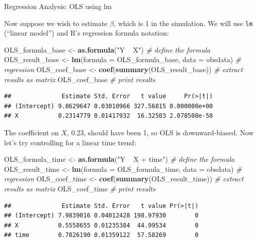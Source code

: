 \documentclass[10pt,ignorenonframetext,]{beamer}
\newenvironment{Shaded}{\begin{snugshade}}{\end{snugshade}}
\newcommand{\KeywordTok}[1]{\textcolor[rgb]{0.13,0.29,0.53}{\textbf{{#1}}}}
\newcommand{\DataTypeTok}[1]{\textcolor[rgb]{0.13,0.29,0.53}{{#1}}}
\newcommand{\StringTok}[1]{\textcolor[rgb]{0.31,0.60,0.02}{{#1}}}
\newcommand{\CommentTok}[1]{\textcolor[rgb]{0.56,0.35,0.01}{\textit{{#1}}}}
\newcommand{\NormalTok}[1]{{#1}}
\begin{document}
\begin{frame}[fragile]{Regression Analysis: OLS using lm}

Now suppose we wish to estimate \(\beta\), which is 1 in the simulation.
We will use \texttt{lm} (``linear model'') and R's regression formula
notation:

\footnotesize

\begin{Shaded}
\begin{Highlighting}[]
\NormalTok{OLS_formula_base <-}\StringTok{ }\KeywordTok{as.formula}\NormalTok{(}\StringTok{"Y ~ X"}\NormalTok{) }\CommentTok{# define the formula}
\NormalTok{OLS_result_base <-}\StringTok{ }\KeywordTok{lm}\NormalTok{(}\DataTypeTok{formula =} \NormalTok{OLS_formula_base, }\DataTypeTok{data =} \NormalTok{obsdata) }\CommentTok{# regression}
\NormalTok{OLS_coef_base <-}\StringTok{ }\KeywordTok{coef}\NormalTok{(}\KeywordTok{summary}\NormalTok{(OLS_result_base)) }\CommentTok{# extract results as matrix}
\NormalTok{OLS_coef_base }\CommentTok{# print results}
\end{Highlighting}
\end{Shaded}

\begin{verbatim}
##              Estimate Std. Error   t value     Pr(>|t|)
## (Intercept) 9.8629647 0.03010966 327.56815 0.000000e+00
## X           0.2314779 0.01417932  16.32503 2.078508e-58
\end{verbatim}

\normalsize

The coefficient on \(X\), 0.23, should have been 1, so OLS is
downward-biased. Now let's try controlling for a linear time trend:

\footnotesize

\begin{Shaded}
\begin{Highlighting}[]
\NormalTok{OLS_formula_time <-}\StringTok{ }\KeywordTok{as.formula}\NormalTok{(}\StringTok{"Y ~ X + time"}\NormalTok{) }\CommentTok{# define the formula}
\NormalTok{OLS_result_time <-}\StringTok{ }\KeywordTok{lm}\NormalTok{(}\DataTypeTok{formula =} \NormalTok{OLS_formula_time, }\DataTypeTok{data =} \NormalTok{obsdata) }\CommentTok{# regression}
\NormalTok{OLS_coef_time <-}\StringTok{ }\KeywordTok{coef}\NormalTok{(}\KeywordTok{summary}\NormalTok{(OLS_result_time)) }\CommentTok{# extract results as matrix}
\NormalTok{OLS_coef_time }\CommentTok{# print results}
\end{Highlighting}
\end{Shaded}

\begin{verbatim}
##              Estimate Std. Error   t value Pr(>|t|)
## (Intercept) 7.9839016 0.04012428 198.97930        0
## X           0.5558655 0.01235384  44.99534        0
## time        0.7826190 0.01359122  57.58269        0
\end{verbatim}

\normalsize

\end{frame}
\end{document}
